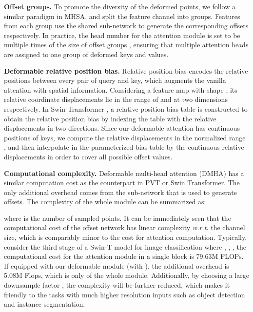\noindent
\textbf{Offset groups.} 
To promote the diversity of the deformed points, we follow a similar paradigm in MHSA, and split the feature channel into  groups. Features from each group use the shared sub-network to generate the corresponding offsets respectively. In practice, the head number  for the attention module is set to be multiple times of the size of offset groups ,
ensuring that multiple attention heads are assigned to one group of deformed keys and values.

\noindent
\textbf{Deformable relative position bias.} Relative position bias encodes the relative positions between every pair of query and key, which augments the vanilla attention with spatial information. Considering a feature map with shape , its relative coordinate displacements lie in the range of  and  at two dimensions respectively. In Swin Transformer \cite{Swin}, a relative position bias table  is constructed to obtain the relative position bias  by indexing the table with the relative displacements in two directions. Since our deformable attention has continuous positions of keys, we compute the relative displacements in the normalized range , and then interpolate  in the parameterized bias table  by the continuous relative displacements in order to cover all possible offset values.

\noindent
\textbf{Computational complexity.} Deformable multi-head attention (DMHA) has a similar computation cost as the counterpart in PVT or Swin Transformer. The only additional overhead comes from the sub-network that is used to generate offsets.
The complexity of the whole module can be summarized as:

where  is the number of sampled points. It can be immediately seen that the computational cost of the offset network has linear complexity \textit{w.r.t.} the channel size, which is comparably minor to the cost for attention computation. Typically, consider the third stage of a Swin-T \cite{Swin} model for image classification where , , , the computational cost for the attention module in a single block is 79.63M FLOPs. If equipped with our deformable module (with ), the additional overhead is 5.08M Flops, which is only  of the whole module. Additionally, by choosing a large downsample factor , the complexity will be further reduced, which makes it friendly to the tasks with much higher resolution inputs such as object detection and instance segmentation. 




